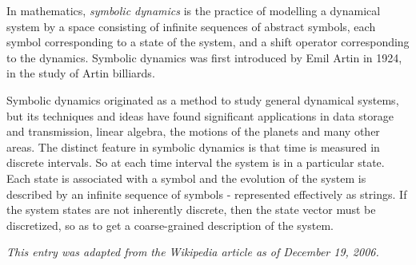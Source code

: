 \documentclass[12pt]{article}
\begin{document}
In mathematics, {\em symbolic dynamics} is the practice of modelling a dynamical system by a space consisting of infinite sequences of abstract symbols, each symbol corresponding to a state of the system, and a shift operator corresponding to the dynamics. Symbolic dynamics was first introduced by Emil Artin in 1924, in the study of Artin billiards.

Symbolic dynamics originated as a method to study general dynamical systems, but its techniques and ideas have found significant applications in data storage and transmission, linear algebra, the motions of the planets and many other areas. The distinct feature in symbolic dynamics is that time is measured in discrete intervals. So at each time interval the system is in a particular state. Each state is associated with a symbol and the evolution of the system is described by an infinite sequence of symbols - represented effectively as strings. If the system states are not inherently discrete, then the state vector must be discretized, so as to get a coarse-grained description of the system.

%

{\it This entry was adapted from the Wikipedia article  as of December 19, 2006.}
\end{document}
